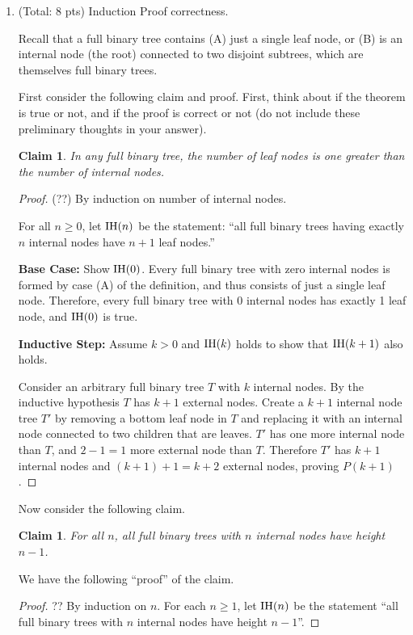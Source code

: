 \documentclass[11pt]{article}
\newtheorem{claim}[theorem]{Claim}
\begin{document}
\begin{enumerate}
\item (Total: 8 pts) Induction Proof correctness.

Recall that a full binary tree 
contains (A) just a single leaf node, or (B) is
an internal node (the root) connected to two disjoint 
subtrees, which are themselves full binary trees.

First consider the following claim and proof.  First, think about if the theorem is true or not, and if the proof is correct or not
(do not include these preliminary thoughts in your answer).

\begin{claim} 
In any full binary tree, the number of leaf nodes is 
one greater than the number of internal nodes.
\end{claim}

\begin{proof} (??)  By induction on number of internal nodes.

For all $n\geq 0$, let $\P(n)$ be the statement:
``all full binary trees having exactly 
$n$ internal nodes have $n+1$ leaf nodes.''

{\bf Base Case:} Show $\P(0)$. 
Every full binary tree with zero internal nodes is formed by
case (A) of the definition, and thus consists of 
just a single leaf node.  
Therefore, every full binary tree
with 0 internal nodes has exactly 1 leaf node, and $\P(0)$ is true.

{\bf Inductive Step:} Assume $k>0$ and $\P(k)$ holds to show that $\P(k+1)$ also holds. 

Consider an arbitrary full binary tree $T$ with $k$ internal nodes. 
By the inductive hypothesis $T$ has  $k+1$ external nodes.
Create a $k+1$ internal node tree $T'$ by removing a bottom leaf node in $T$ and replacing it with an internal node connected to
two children that are leaves.
$T'$ has one more internal node than $T$, and $2-1=1$ more external node than $T$.
Therefore $T'$ has $k+1$ internal nodes and $(k+1)+1=k+2$ external nodes, proving $P(k+1)$.
\end{proof}

Now consider the following claim.  
\begin{claim} \label{c:height}
For all $n$, all full binary trees with $n$ internal nodes have
height $n-1$.
\end{claim}

We have the following ``proof'' of the claim.

\begin{proof} ??
By induction on $n$. For each $n\geq 1$,
let $\P(n)$ be the statement ``all  full binary trees with $n$ internal nodes have height $n-1$''.


\end{proof}
\end{enumerate}
\end{document}
